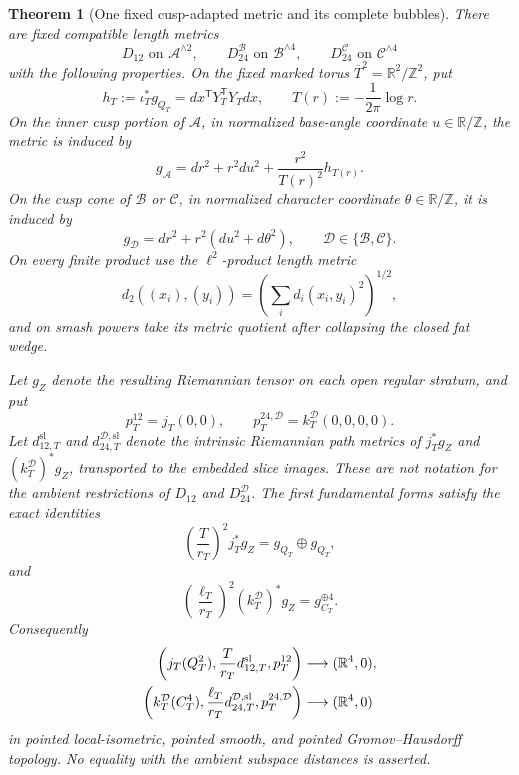 \documentclass[11pt,letterpaper]{article}
\numberwithin{equation}{section}
\newtheorem{theorem}{Theorem}[section]
\theoremstyle{definition}
\theoremstyle{remark}
\newcommand{\R}{\mathbb R}
\newcommand{\Z}{\mathbb Z}
\begin{document}
\begin{theorem}[One fixed cusp-adapted metric and its complete bubbles]
\label{thm:fixed-cusp-metric}
There are fixed compatible length metrics
\[
 D_{12}\text{ on }\mathcal A^{\wedge2},\qquad
 D_{24}^{\mathcal B}\text{ on }\mathcal B^{\wedge4},\qquad
 D_{24}^{\mathcal C}\text{ on }\mathcal C^{\wedge4}
\]
with the following properties.  On the fixed marked torus
\(\overline T^2=\R^2/\Z^2\), put
\[
 h_T:=\iota_T^*g_{Q_T}
 =dx^{\mathsf T}Y_T^{\mathsf T}Y_Tdx,\qquad
 T(r):=-\frac{1}{2\pi}\log r.
\]
On the inner cusp portion of \(\mathcal A\), in normalized base-angle
coordinate \(u\in\R/\Z\), the metric is induced by
\begin{equation}
 g_{\mathcal A}
 =dr^2+r^2du^2+\frac{r^2}{T(r)^2}h_{T(r)}.
 \label{eq:fixed-A-metric}
\end{equation}
On the cusp cone of \(\mathcal B\) or \(\mathcal C\), in normalized
character coordinate \(\theta\in\R/\Z\), it is induced by
\begin{equation}
 g_{\mathcal D}=dr^2+r^2(du^2+d\theta^2),
 \qquad\mathcal D\in\{\mathcal B,\mathcal C\}.
 \label{eq:fixed-BC-metric}
\end{equation}
On every finite product use the \(\ell^2\)-product length metric
\[
 d_2((x_i),(y_i))=\left(\sum_i d_i(x_i,y_i)^2\right)^{1/2},
\]
and on smash powers take its metric quotient after collapsing the closed
fat wedge.

Let \(g_Z\) denote the resulting Riemannian tensor on each open regular
stratum, and put
\[
 p_T^{12}=j_T(0,0),\qquad
 p_T^{24,\mathcal D}=k_T^{\mathcal D}(0,0,0,0).
\]
Let \(d_{12,T}^{\mathrm{sl}}\) and
\(d_{24,T}^{\mathcal D,\mathrm{sl}}\) denote the intrinsic Riemannian path
metrics of \(j_T^*g_Z\) and \((k_T^{\mathcal D})^*g_Z\), transported to
the embedded slice images.  These are not notation for the ambient
restrictions of \(D_{12}\) and \(D_{24}^{\mathcal D}\).  The first
fundamental forms satisfy the exact identities
\begin{equation}
 \left(\frac{T}{r_T}\right)^2j_T^*g_Z
 =g_{Q_T}\oplus g_{Q_T},
 \label{eq:fixed-A-slice}
\end{equation}
and
\begin{equation}
 \left(\frac{\ell_T}{r_T}\right)^2
 (k_T^{\mathcal D})^*g_Z
 =g_{C_T}^{\oplus4}.
 \label{eq:fixed-BC-slice}
\end{equation}
Consequently
\begin{align}
 \left(j_T(Q_T^2),\frac{T}{r_T}d_{12,T}^{\mathrm{sl}},p_T^{12}\right)
 &\longrightarrow(\R^4,0),\notag\\
 \left(k_T^{\mathcal D}(C_T^4),
       \frac{\ell_T}{r_T}d_{24,T}^{\mathcal D,\mathrm{sl}},
       p_T^{24,\mathcal D}\right)
 &\longrightarrow(\R^4,0)
 \label{eq:fixed-slice-bubbles}
\end{align}
in pointed local-isometric, pointed smooth, and pointed
Gromov--Hausdorff topology.  No equality with the ambient subspace
distances is asserted.


\end{theorem}
\end{document}

